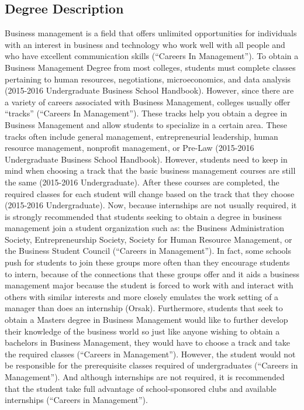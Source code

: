 \begin{multicols}{2}
\section{Degree Description}
    Business management is a field that offers unlimited opportunities for individuals with an interest in business and technology who work well with all people and who have excellent communication skills (“Careers In Management”). To obtain a Business Management Degree from most colleges, students must complete classes pertaining to human resources, negotiations, microeconomics, and data analysis (2015-2016 Undergraduate Business School Handbook). However, since there are a variety of careers associated with Business Management, colleges usually offer “tracks” (“Careers In Management”). These tracks help you obtain a degree in Business Management and allow students to specialize in a certain area. These tracks often include general management, entrepreneurial leadership, human resource management, nonprofit management, or Pre-Law (2015-2016 Undergraduate Business School Handbook). However, students need to keep in mind when choosing a track that the basic business management courses are still the same (2015-2016 Undergraduate). After these courses are completed, the required classes for each student will change based on the track that they choose (2015-2016 Undergraduate). Now, because internships are not usually required, it is strongly recommended that students seeking to obtain a degree in business management join a student organization such as: the Business Administration Society, Entrepreneurship Society, Society for Human Resource Management, or the Business Student Council (“Careers in Management”). In fact, some schools push for students to join these groups more often than they encourage students to intern, because of the connections that these groups offer and it aids a business management major because the student is forced to work with and interact with others with similar interests and more closely emulates the work setting of a manager than does an internship (Orsak). Furthermore, students that seek to obtain a Masters degree in Business Management would like to further develop their knowledge of the business world so just like anyone wishing to obtain a bachelors in Business Management, they would have to choose a track and take the required classes (“Careers in Management”). However, the student would not be responsible for the prerequisite classes required of undergraduates (“Careers in Management”). And although internships are not required, it is recommended that the student take full advantage of school-sponsored clubs and available internships (“Careers in Management”).

\end{multicols}
